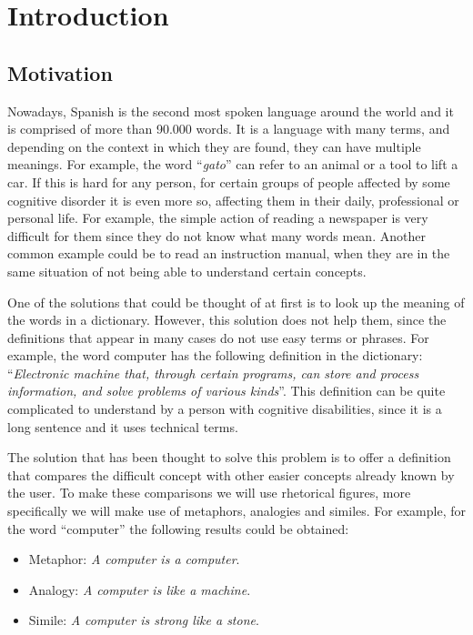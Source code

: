 \chapter{Introduction}
\label{cap:introduction}

\section{Motivation}
\label{sec:motivation}

Nowadays, Spanish is the second most spoken language around the world and it is comprised of more than 90.000 words. It is a language with many terms, and depending on the context in which they are found, they can have multiple meanings. For example, the word ``\textit{gato}'' can refer to an animal or a tool to lift a car. If this is hard for any person, for certain groups of people affected by some cognitive disorder it is even more so, affecting them in their daily, professional or personal life. For example, the simple action of reading a newspaper is very difficult for them since they do not know what many words mean. Another common example could be to read an instruction manual, when they are in the same situation of not being able to understand certain concepts.


One of the solutions that could be thought of at first is to look up the meaning of the words in a dictionary. However, this solution does not help them, since the definitions that appear in many cases do not use easy terms or phrases. For example, the word computer has the following definition in the dictionary: ``\textit{Electronic machine that, through certain programs, can store and process information, and solve problems of various kinds}''. This definition can be quite complicated to understand by a person with cognitive disabilities, since it is a long sentence and it uses technical terms.


The solution that has been thought to solve this problem is to offer a definition that compares the difficult concept with other easier concepts already known by the user. To make these comparisons we will use rhetorical figures, more specifically we will make use of metaphors, analogies and similes. For example, for the word ``computer'' the following results could be obtained:

\begin{itemize}
	\item Metaphor: \textit{A computer is a computer}.
	\item Analogy: \textit{A computer is like a machine}.
	\item Simile: \textit{A computer is strong like a stone}.
\end{itemize}

